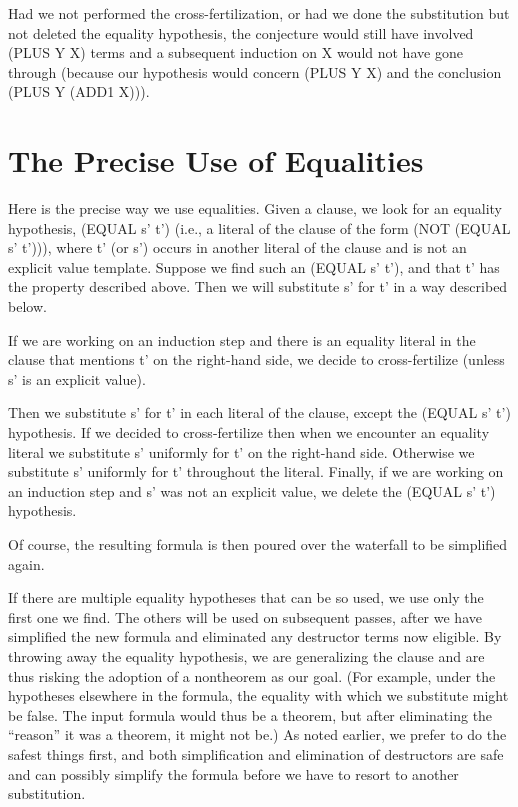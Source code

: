 \documentclass[10pt]{book}
\begin{document}
Had we not performed the cross-fertilization, or had we done the
substitution but not deleted the equality hypothesis, the
conjecture would  still have involved (PLUS Y X) terms and a subsequent
induction on X would not have gone through (because our hypothesis would
concern (PLUS Y X) and the conclusion (PLUS Y (ADD1 X))).

\section{The Precise Use of Equalities}
Here is the precise way we use equalities.
Given a clause, we look for an equality hypothesis, (EQUAL s' t') (i.e.,
a literal of the clause of the form (NOT (EQUAL s' t'))), where t' (or s')
occurs in another literal of the clause and is not an explicit value template.
Suppose we find such an (EQUAL s' t'), and that t' has the property described
above.  Then we will substitute s' for t' in a way described below.

If we are working on an induction step and there is an equality literal in
the clause that mentions t' on the right-hand side,
we decide to cross-fertilize (unless s' is an explicit value).

Then we substitute s' for t' in each literal of the clause, except the
(EQUAL s' t') hypothesis.  If we decided to cross-fertilize
then when we encounter an equality literal we substitute s' uniformly for t' on
the right-hand side.  Otherwise we substitute s' uniformly for t' throughout the literal.
Finally, if we are working on an induction step and s' was
not an explicit value, we delete the (EQUAL s' t') hypothesis.

Of course, the resulting formula is then poured over the
waterfall to be simplified again.

If there are multiple equality hypotheses that can be so used, we
use only the first one we find.  The others will be used on subsequent
passes, after we have  simplified the new formula and
eliminated any destructor terms  now eligible.
By throwing away the equality hypothesis, we are generalizing
the clause and are thus risking the adoption of a nontheorem as our
goal.  (For example, under the hypotheses elsewhere in the formula,
the equality with which we substitute might be false.  The input formula
would thus be a theorem, but after eliminating the ``reason'' it was
a theorem, it might not be.)
As noted earlier, we prefer to do the safest things first,
and both simplification and elimination of destructors are safe and
can possibly simplify the formula before we have to resort to
another substitution.
\end{document}
